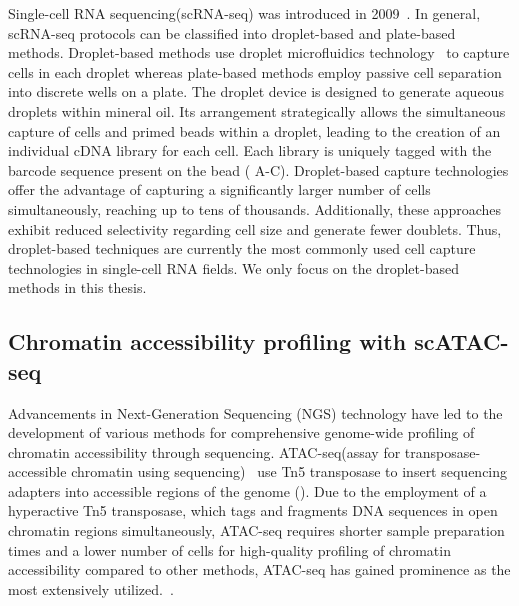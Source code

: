 Single-cell RNA sequencing(scRNA-seq) was introduced in 2009~\citep{tang2009mrna}. In general, scRNA-seq protocols can be classified into droplet-based and plate-based methods. Droplet-based methods use droplet microfluidics technology~\citep{dropletcompare2019, droplet2019practice} to capture cells in each droplet whereas plate-based methods employ passive cell separation into discrete wells on a plate. The droplet device is designed to generate aqueous droplets within mineral oil. Its arrangement strategically allows the simultaneous capture of cells and primed beads within a droplet, leading to the creation of an individual cDNA library for each cell. Each library is uniquely tagged with the barcode sequence present on the bead ( A-C). Droplet-based capture technologies offer the advantage of capturing a significantly larger number of cells simultaneously, reaching up to tens of thousands. Additionally, these approaches exhibit reduced selectivity regarding cell size and generate fewer doublets. Thus, droplet-based techniques are currently the most commonly used cell capture technologies in single-cell RNA fields. We only focus on the droplet-based methods in this thesis.


\subsection{Chromatin accessibility profiling with scATAC-seq}
\label{background:sec1:scATAC}

Advancements in Next-Generation Sequencing (NGS) technology have led to the development of various methods for comprehensive genome-wide profiling of chromatin accessibility through sequencing. ATAC-seq(assay for transposase-accessible chromatin using sequencing)~\citep{buenrostro2013atacseq} use Tn5 transposase to insert sequencing adapters into accessible regions of the genome (). Due to the employment of a hyperactive Tn5 transposase, which tags and fragments DNA sequences in open chromatin regions simultaneously, ATAC-seq requires shorter sample preparation times and a lower number of cells for high-quality profiling of chromatin accessibility compared to other methods, ATAC-seq has gained prominence as the most extensively utilized.~\citep{minnoye2021chromatin}.

